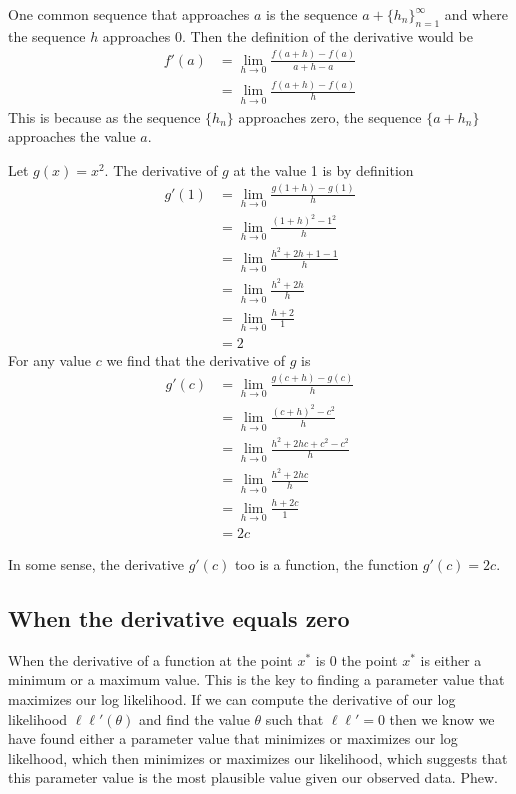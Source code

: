One common sequence that approaches $a$ is the sequence $a + \{h_{n}\}_{n=1}^{\infty}$ and where the sequence $h$ approaches $0$.
Then the definition of the derivative would be 
\begin{align}
    f'(a) &= \lim_{ h \to 0 } \frac{f(a+h) - f(a)}{a+h-a} \\ 
          &= \lim_{ h \to 0 } \frac{f(a+h) - f(a)}{h} 
\end{align}
This is because as the sequence $\{h_{n}\}$ approaches zero, the sequence $\{a+h_{n}\}$ approaches the value $a$.

\ex Let $g(x) = x^{2}$. The derivative of $g$ at the value 1 is by definition
\begin{align}
    g'(1) &= \lim_{ h \to 0 } \frac{g(1+h) - g(1) }{h} \\ 
          &= \lim_{ h \to 0 } \frac{ (1+h)^{2} - 1^{2} }{h}\\
          &= \lim_{ h \to 0 } \frac{ h^{2} + 2h + 1 - 1 }{h}\\
          &= \lim_{ h \to 0 } \frac{ h^{2} + 2h }{h}\\
          &= \lim_{ h \to 0 } \frac{ h + 2 }{1}\\
          &=2
\end{align}
For any value $c$ we find that the derivative of $g$ is 
\begin{align}
    g'(c) &= \lim_{ h \to 0 } \frac{g(c+h) - g(c) }{h} \\ 
          &= \lim_{ h \to 0 } \frac{ (c+h)^{2} - c^{2} }{h}\\
          &= \lim_{ h \to 0 } \frac{ h^{2} + 2hc + c^{2} - c^{2} }{h}\\
          &= \lim_{ h \to 0 } \frac{ h^{2} + 2hc }{h}\\
          &= \lim_{ h \to 0 } \frac{ h + 2c }{1}\\
          &=2c
\end{align}

In some sense, the derivative $g'(c)$ too is a function, the function $g'(c) = 2c$.

\subsection{When the derivative equals zero}

When the derivative of a function at the point $x^{*}$ is 0 the point $x^{*}$ is either a minimum or a maximum value. 
This is the key to finding a parameter value that maximizes our log likelihood. 
If we can compute the derivative of our log likelihood $\ell \ell'(\theta)$ and find the value $\theta$ such that $\ell \ell' = 0$ then we know we have found either a parameter value that minimizes or maximizes our log likelhood, which then minimizes or maximizes our likelihood, which suggests that this parameter value is the most plausible value given our observed data. Phew. 

